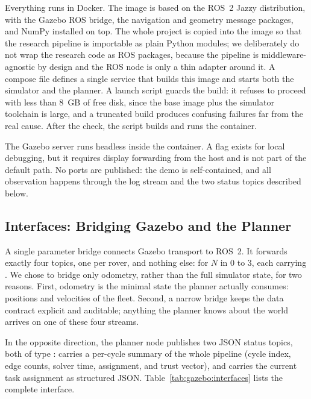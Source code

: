 Everything runs in Docker. The image is based on the ROS~2 Jazzy
distribution, with the Gazebo ROS bridge, the navigation and geometry
message packages, and NumPy installed on top. The whole project is copied
into the image so that the research pipeline is importable as plain
Python modules; we deliberately do not wrap the research code as ROS
packages, because the pipeline is middleware-agnostic by design and the
ROS node is only a thin adapter around it. A compose file defines a
single service that builds this image and starts both the simulator and
the planner. A launch script guards the build: it refuses to proceed with
less than 8~GB of free disk, since the base image plus the simulator
toolchain is large, and a truncated build produces confusing failures far
from the real cause. After the check, the script builds and runs the
container.

The Gazebo server runs headless inside the container. A 
flag exists for local debugging, but it requires display forwarding from
the host and is not part of the default path. No ports are published:
the demo is self-contained, and all observation happens through the log
stream and the two status topics described below.

\subsection{Interfaces: Bridging Gazebo and the Planner}
\label{sec:gazebo:interfaces}

A single parameter bridge connects Gazebo transport to ROS~2. It
forwards exactly four topics, one per rover, and nothing else:
 for $N$ in $0$ to $3$, each carrying
. We chose to bridge only odometry, rather than
the full simulator state, for two reasons. First, odometry is the
minimal state the planner actually consumes: positions and velocities of
the fleet. Second, a narrow bridge keeps the data contract explicit and
auditable; anything the planner knows about the world arrives on one of
these four streams.

In the opposite direction, the planner node publishes two JSON status
topics, both of type : 
carries a per-cycle summary of the whole pipeline (cycle index, edge
counts, solver time, assignment, and trust vector), and
 carries the current task assignment as
structured JSON. Table~\ref{tab:gazebo:interfaces} lists the complete
interface.

